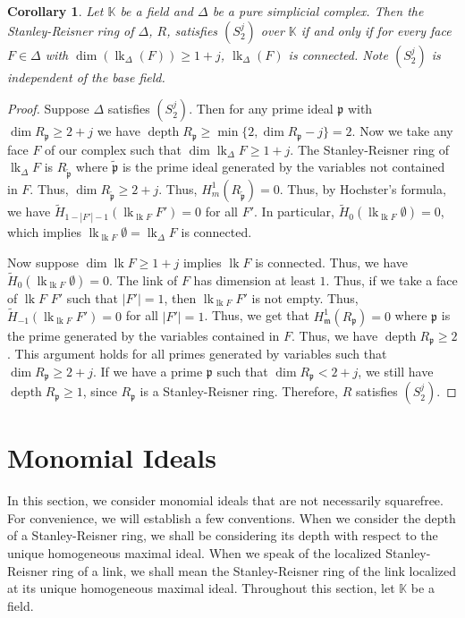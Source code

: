 \documentclass[11pt]{amsart}
\numberwithin{equation}{section}
\newtheorem{cor}[theorem]{Corollary}
\theoremstyle{definition}
\theoremstyle{remark}
\newcommand{\lk}{\operatorname{lk}}
\newcommand{\depth}{\operatorname{depth}}
\begin{document}
\begin{cor}
Let $\mathbb{K}$ be a field and $\Delta$ be a pure simplicial complex. Then the Stanley-Reisner ring of $\Delta$, $R$, satisfies $(S_2^j)$ over $\mathbb{K}$ if and only if for every face $F \in \Delta$ with $\dim (\lk _{\Delta} (F)) \geq 1+j$, $\lk _{\Delta} (F)$ is connected. Note $(S_2^j)$ is independent of the base field.
\end{cor}

\begin{proof}
Suppose $\Delta$ satisfies $(S_2^j)$.  Then for any prime ideal $\mathfrak{p}$ with $\dim R_\mathfrak{p} \geq 2+j$ we have $\depth R_\mathfrak{p} \geq \min \{ 2, \dim R_\mathfrak{p}-j \} = 2$.  Now we take any face $F$ of our complex such that $\dim \lk_{\Delta} F \geq 1+j$.  The Stanley-Reisner ring of $\lk_{\Delta} F$ is $R_{\tilde{\mathfrak{p}}}$ where $\tilde{\mathfrak{p}}$ is the prime ideal generated by the variables not contained in $F$.  Thus, $\dim R_{\tilde{\mathfrak{p}}} \geq 2+j$.  Thus, $H_m^1(R_{\tilde{\mathfrak{p}}})=0$.  Thus, by Hochster's formula, we have $\tilde{H}_{1-|F'|-1}(\lk_{\lk F} F') = 0$ for all $F'$.  In particular, $\tilde{H}_{0}(\lk_{\lk F} \emptyset) = 0$, which implies $\lk_{\lk F} \emptyset = \lk_{\Delta}F$ is connected.  

Now suppose $\dim \lk F \geq 1+j$ implies $\lk F$ is connected.  Thus, we have $\tilde{H}_0(\lk_{\lk F} \emptyset) = 0$.  The link of $F$ has dimension at least $1$.  Thus, if we take a face of $\lk F$ $F'$ such that $|F'|=1$, then $\lk _{\lk F} F'$ is not empty.  Thus, $\tilde {H}_{-1}(\lk_{\lk F} F') = 0$ for all $|F'| = 1$.  Thus, we get that $H_\mathfrak{m}^1(R_\mathfrak{p}) = 0$ where $\mathfrak{p}$ is the prime generated by the variables contained in $F$.  Thus, we have $\depth R_\mathfrak{p} \geq 2$.  This argument holds for all primes generated by variables such that $\dim R_\mathfrak{p} \geq 2+j$.  If we have a prime $\mathfrak{p}$ such that $\dim R_\mathfrak{p} < 2+j$, we still have $\depth R_\mathfrak{p} \geq 1$, since $R_\mathfrak{p}$ is a Stanley-Reisner ring.  Therefore, $R$ satisfies $(S_2^j)$.  
\end{proof}

\section{Monomial Ideals}

In this section, we consider monomial ideals that are not necessarily squarefree.  For convenience, we will establish a few conventions.  When we consider the depth of a Stanley-Reisner ring, we shall be considering its depth with respect to the unique homogeneous maximal ideal.  When we speak of the localized Stanley-Reisner ring of a link, we shall mean the Stanley-Reisner ring of the link localized at its unique homogeneous maximal ideal.  Throughout this section, let $\mathbb{K}$ be a field.
\end{document}

